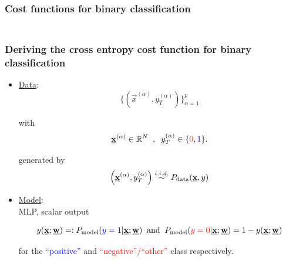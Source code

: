 
\subsubsection{Cost functions for binary classification}

\begin{frame}\frametitle{\subsubsecname\\Deriving the cross entropy cost function for binary classification}


\begin{itemize}
\item[]\underline{Data}:\\

\begin{equation}
\Big\{ \left( \vec x^{(\alpha)}, y_T^{(\alpha)} \right) \Big \}_{\alpha=1}^{p}
\end{equation}

with 
$$
\vec x^{(\alpha)} \in \R^N\;\;,\;\; y_T^{(\alpha)} \in \{{\color{red}0}, {\color{blue}1}\}.
$$

generated by
\begin{equation}
\left( \vec x^{(\alpha)}, y_T^{(\alpha)} \right) \stackrel{\iid}{\sim} P_{\text{data}}(\vec x, y)
\end{equation}

\pause

\item[]\underline{Model}:\\

MLP, scalar output 

\begin{equation}
y(\vec x;\vec w) =: P_{\text{model}} ({\color{blue}y=1}|\vec x;\vec w) \;\; \text{and} \;\; P_{\text{model}} ({\color{red}y=0}|\vec x; \vec w) = 1-y(\vec x;\vec w)
\end{equation}

for the \textcolor{blue}{``positive''} and \textcolor{red}{``negative''/``other''} class respectively.

\end{itemize}

\end{frame}

